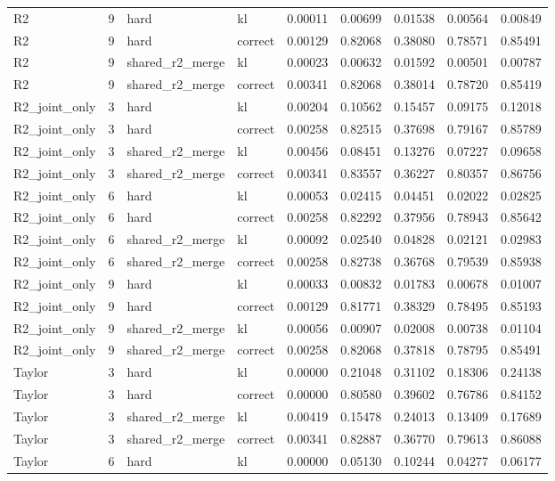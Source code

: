 \begin{tabular}{lrllrrrrr}
R2 & 9 & hard & kl & 0.00011 & 0.00699 & 0.01538 & 0.00564 & 0.00849 \\
R2 & 9 & hard & correct & 0.00129 & 0.82068 & 0.38080 & 0.78571 & 0.85491 \\
R2 & 9 & shared_r2_merge & kl & 0.00023 & 0.00632 & 0.01592 & 0.00501 & 0.00787 \\
R2 & 9 & shared_r2_merge & correct & 0.00341 & 0.82068 & 0.38014 & 0.78720 & 0.85419 \\
R2_joint_only & 3 & hard & kl & 0.00204 & 0.10562 & 0.15457 & 0.09175 & 0.12018 \\
R2_joint_only & 3 & hard & correct & 0.00258 & 0.82515 & 0.37698 & 0.79167 & 0.85789 \\
R2_joint_only & 3 & shared_r2_merge & kl & 0.00456 & 0.08451 & 0.13276 & 0.07227 & 0.09658 \\
R2_joint_only & 3 & shared_r2_merge & correct & 0.00341 & 0.83557 & 0.36227 & 0.80357 & 0.86756 \\
R2_joint_only & 6 & hard & kl & 0.00053 & 0.02415 & 0.04451 & 0.02022 & 0.02825 \\
R2_joint_only & 6 & hard & correct & 0.00258 & 0.82292 & 0.37956 & 0.78943 & 0.85642 \\
R2_joint_only & 6 & shared_r2_merge & kl & 0.00092 & 0.02540 & 0.04828 & 0.02121 & 0.02983 \\
R2_joint_only & 6 & shared_r2_merge & correct & 0.00258 & 0.82738 & 0.36768 & 0.79539 & 0.85938 \\
R2_joint_only & 9 & hard & kl & 0.00033 & 0.00832 & 0.01783 & 0.00678 & 0.01007 \\
R2_joint_only & 9 & hard & correct & 0.00129 & 0.81771 & 0.38329 & 0.78495 & 0.85193 \\
R2_joint_only & 9 & shared_r2_merge & kl & 0.00056 & 0.00907 & 0.02008 & 0.00738 & 0.01104 \\
R2_joint_only & 9 & shared_r2_merge & correct & 0.00258 & 0.82068 & 0.37818 & 0.78795 & 0.85491 \\
Taylor & 3 & hard & kl & 0.00000 & 0.21048 & 0.31102 & 0.18306 & 0.24138 \\
Taylor & 3 & hard & correct & 0.00000 & 0.80580 & 0.39602 & 0.76786 & 0.84152 \\
Taylor & 3 & shared_r2_merge & kl & 0.00419 & 0.15478 & 0.24013 & 0.13409 & 0.17689 \\
Taylor & 3 & shared_r2_merge & correct & 0.00341 & 0.82887 & 0.36770 & 0.79613 & 0.86088 \\
Taylor & 6 & hard & kl & 0.00000 & 0.05130 & 0.10244 & 0.04277 & 0.06177 \\

\end{tabular}
